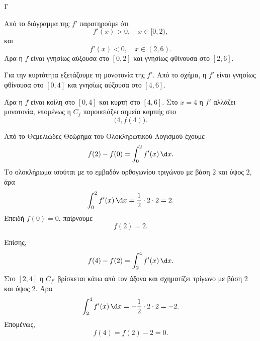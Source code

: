 \begin{thema}{Γ}

\begin{center}
\end{center}

\begin{erwthma}
\item Από το διάγραμμα της $f'$ παρατηρούμε ότι
\[
f'(x)>0,\quad x\in[0,2),
\]
και
\[
f'(x)<0,\quad x\in(2,6).
\]
Άρα η $f$ είναι γνησίως αύξουσα στο $[0,2]$ και γνησίως φθίνουσα στο $[2,6]$.

Για την κυρτότητα εξετάζουμε τη μονοτονία της $f'$. Από το σχήμα, η $f'$ είναι γνησίως φθίνουσα στο $[0,4]$ και γνησίως αύξουσα στο $[4,6]$.

Άρα η $f$ είναι κοίλη στο $[0,4]$ και κυρτή στο $[4,6]$. Στο $x=4$ η $f'$ αλλάζει μονοτονία, επομένως η $C_f$ παρουσιάζει σημείο καμπής στο
\[
\bigl(4,f(4)\bigr).
\]

\item Από το Θεμελιώδες Θεώρημα του Ολοκληρωτικού Λογισμού έχουμε
\[
f(2)-f(0)=\int_0^2 f'(x)\,\d x.
\]
Το ολοκλήρωμα ισούται με το εμβαδόν ορθογωνίου τριγώνου με βάση $2$ και ύψος $2$, άρα
\[
\int_0^2 f'(x)\,\d x=\frac{1}{2}\cdot 2\cdot 2=2.
\]
Επειδή $f(0)=0$, παίρνουμε
\[
f(2)=2.
\]

Επίσης,
\[
f(4)-f(2)=\int_2^4 f'(x)\,\d x.
\]
Στο $[2,4]$ η $C_{f'}$ βρίσκεται κάτω από τον άξονα και σχηματίζει τρίγωνο με βάση $2$ και ύψος $2$. Άρα
\[
\int_2^4 f'(x)\,\d x=-\frac{1}{2}\cdot 2\cdot 2=-2.
\]
Επομένως,
\[
f(4)=f(2)-2=0.
\]


\end{erwthma}
\end{thema}
